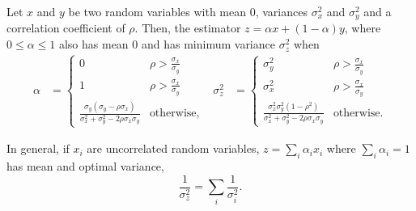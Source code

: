 \begin{lemma}
  \label{lem:combined-variance}
  Let $x$ and $y$ be two random variables with mean $0$, variances $\sigma^2_x$ and $\sigma^2_y$ and a correlation coefficient of $\rho$.
  Then, the estimator $z = \alpha x + (1-\alpha) y$, where $0 \le \alpha
  \le 1$ also has mean $0$ and has minimum variance $\sigma^2_z$ when
  \begin{align*}
  \alpha &= 
  \begin{cases}
    0 & \rho > \frac{\sigma_x}{\sigma_y} \\
    1 & \rho > \frac{\sigma_x}{\sigma_y} \\
    \frac{\sigma_y (\sigma_y - \rho \sigma_x)}{\sigma_x^2 + \sigma_y^2 - 2\rho \sigma_x \sigma_y} & \text{otherwise},
  \end{cases}
  &
  \sigma^2_z &= 
  \begin{cases}
    \sigma^2_y & \rho > \frac{\sigma_x}{\sigma_y} \\
    \sigma^2_x & \rho > \frac{\sigma_x}{\sigma_y} \\
    \frac{\sigma_x^2 \sigma_y^2 (1 - \rho^2)}{\sigma_x^2 + \sigma_y^2 - 2 \rho \sigma_x \sigma_y} & \text{otherwise}.
  \end{cases}
  \end{align*}

  In general, if $x_i$ are uncorrelated random variables, $z = \sum_{i} \alpha_i x_i$ where $\sum_i \alpha_i = 1$ has mean and optimal variance,
  $$\frac{1}{\sigma_z^2} = \sum_i \frac{1}{\sigma_i^2}.$$
\end{lemma}
